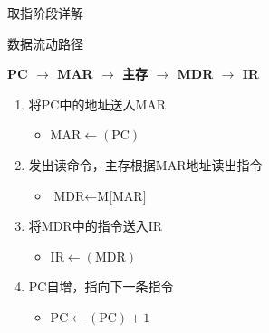 \documentclass[10pt, aspectratio=169]{beamer}
\begin{document}
\begin{frame}{取指阶段详解}
    \begin{block}{数据流动路径}
        \centerline{\textbf{PC $\rightarrow$ MAR $\rightarrow$ 主存 $\rightarrow$ MDR $\rightarrow$ IR}}
    \end{block}
    \vspace{0.3em}
    \begin{enumerate}
        \item 将PC中的地址送入MAR
            \begin{itemize}
                \item $\text{MAR} \leftarrow (\text{PC})$
            \end{itemize}
        \item 发出读命令，主存根据MAR地址读出指令
            \begin{itemize}
                \item $\text{MDR} \leftarrow \text{M[MAR]}$
            \end{itemize}
        \item 将MDR中的指令送入IR
            \begin{itemize}
                \item $\text{IR} \leftarrow (\text{MDR})$
            \end{itemize}
        \item PC自增，指向下一条指令
            \begin{itemize}
                \item $\text{PC} \leftarrow (\text{PC}) + 1$
            \end{itemize}
    \end{enumerate}
\end{frame}
\end{document}
